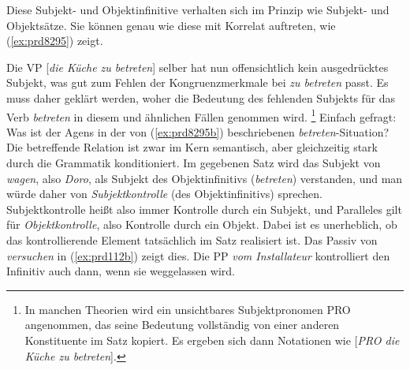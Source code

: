 
Diese Subjekt- und Objektinfinitive verhalten sich im Prinzip wie Subjekt- und Objektsätze.
Sie können genau wie diese mit Korrelat auftreten, wie (\ref{ex:prd8295}) zeigt.

\begin{exe}
  \ex\label{ex:prd8295} 
  \begin{xlist}
  \end{xlist}
\end{exe}

Die VP [\textit{die Küche zu betreten}] selber hat nun offensichtlich kein ausgedrücktes Subjekt, was gut zum Fehlen der Kongruenzmerkmale bei \textit{zu betreten} passt.
Es muss daher geklärt werden, woher die Bedeutung des fehlenden Subjekts für das Verb \textit{betreten} in diesem und ähnlichen Fällen genommen wird.%
\footnote{In manchen Theorien wird ein unsichtbares Subjektpronomen PRO angenommen, das seine Bedeutung vollständig von einer anderen Konstituente im Satz kopiert.
Es ergeben sich dann Notationen wie [\textit{PRO die Küche zu betreten}].}
Einfach gefragt:
Was ist der Agens in der von (\ref{ex:prd8295b}) beschriebenen \textit{betreten}-Situation?
Die betreffende Relation ist zwar im Kern semantisch, aber gleichzeitig stark durch die Grammatik konditioniert.
Im gegebenen Satz wird das Subjekt von \textit{wagen}, also \textit{Doro}, als Subjekt des Objektinfinitivs (\textit{betreten}) verstanden, und man würde daher von \textit{Subjektkontrolle} (des Objektinfinitivs) sprechen.
Subjektkontrolle heißt also immer Kontrolle durch ein Subjekt, und Paralleles gilt für \textit{Objektkontrolle}, also Kontrolle durch ein Objekt.
Dabei ist es unerheblich, ob das kontrollierende Element tatsächlich im Satz realisiert ist.
Das Passiv von \textit{versuchen} in (\ref{ex:prd112b}) zeigt dies.
Die PP \textit{vom Installateur} kontrolliert den Infinitiv auch dann, wenn sie weggelassen wird.

\begin{exe}
  \ex\label{ex:prd112} 
  \begin{xlist}
  \end{xlist}
\end{exe}

